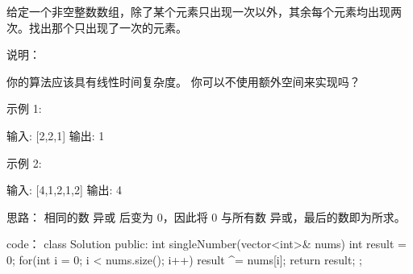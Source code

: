 给定一个非空整数数组，除了某个元素只出现一次以外，其余每个元素均出现两次。找出那个只出现了一次的元素。

说明：

你的算法应该具有线性时间复杂度。 你可以不使用额外空间来实现吗？

示例 1:

输入: [2,2,1]
输出: 1

示例 2:

输入: [4,1,2,1,2]
输出: 4



























思路：
相同的数 异或 后变为 0，因此将 0 与所有数 异或，最后的数即为所求。

































code：
class Solution {
public:
    int singleNumber(vector<int>& nums) {
        int result = 0;
        for(int i = 0; i < nums.size(); i++)
            result ^= nums[i];
        return result;
    }
};